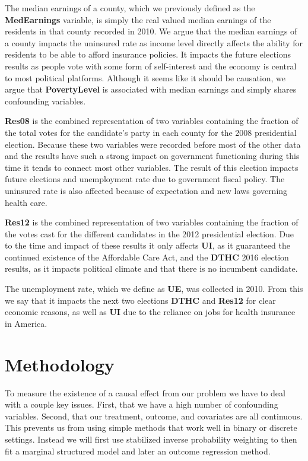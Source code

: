 \documentclass[11pt, conference,compsoc]{IEEEtran}
\begin{document}
The median earnings of a county, which we previously defined as the \textbf{MedEarnings} variable, is simply the real valued median earnings of the residents in that county recorded in 2010. We argue that the median earnings of a county impacts the uninsured rate as income level directly affects the ability for residents to be able to afford insurance policies. It impacts the future elections results as people vote with some form of self-interest and the economy is central to most political platforms.  Although it seems like it should be causation, we argue that \textbf{PovertyLevel} is associated with median earnings and simply shares confounding variables.

\textbf{Res08} is the combined representation of two variables containing the fraction of the total votes for the candidate’s party in each county for the 2008 presidential election. Because these two variables were recorded before most of the other data and the results have such a strong impact on government functioning during this time it tends to connect most other variables. The result of this election impacts future elections and unemployment rate due to government fiscal policy. The uninsured rate is also affected because of expectation and new laws governing health care. 

\textbf{Res12} is the combined representation of two variables containing the fraction of the votes cast for the different candidates in the 2012 presidential election. Due to the time and impact of these results it only affects \textbf{UI}, as it guaranteed the continued existence of the Affordable Care Act, and the \textbf{DTHC} 2016 election results, as it impacts political climate and that there is no incumbent candidate.

The unemployment rate, which we define as \textbf{UE}, was collected in 2010. From this we say that it impacts the next two elections \textbf{DTHC} and \textbf{Res12} for clear economic reasons, as well as \textbf{UI} due to the reliance on jobs for health insurance in America.

\section{Methodology}
To measure the existence of a causal effect from our problem we have to deal with a couple key issues. First, that we have a high number of confounding variables. Second, that our treatment, outcome, and covariates are all continuous. This prevents us from using simple methods that work well in binary or discrete settings. Instead we will first use stabilized inverse probability weighting to then fit a marginal structured model and later an outcome regression method.
\end{document}
